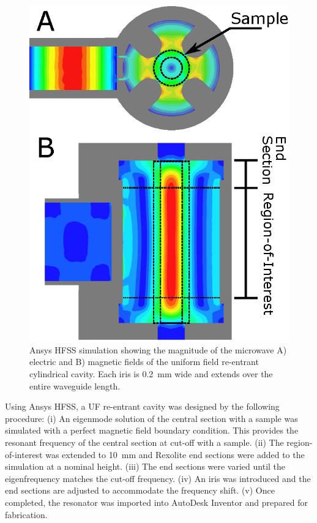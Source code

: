 \begin{figure}[htb]\centering
 \includegraphics{Kapitel/Ch2-Images/03-TE01UEMFields.eps}
 \caption[Simulation of the microwave fields.]{Ansys HFSS simulation showing the magnitude of the microwave A) electric and B) magnetic fields of the uniform field re-entrant cylindrical \cylTE{} cavity. Each iris is 0.2~mm wide and extends over the entire waveguide length.}
 \label{Ch2-fig:EMFields}
\end{figure}

Using Ansys HFSS, a UF re-entrant \cylTE{} cavity was designed by the following procedure: (i) An eigenmode solution of the central section with a sample was simulated with a perfect magnetic field boundary condition. This provides the resonant frequency of the central section at cut-off with a sample. (ii) The region-of-interest was extended to 10~mm and Rexolite end sections were added to the simulation at a nominal height. (iii) The end sections were varied until the eigenfrequency matches the cut-off frequency. (iv) An iris was introduced and the end sections are adjusted to accommodate the frequency shift. (v) Once completed, the resonator was imported into AutoDesk Inventor and prepared for fabrication. 

